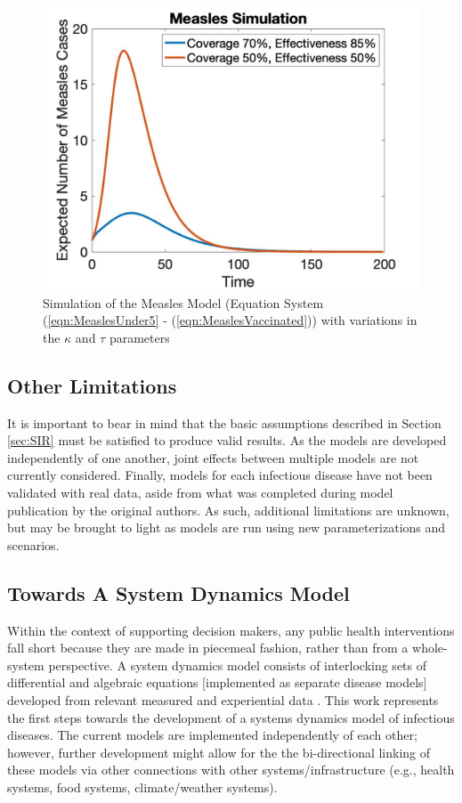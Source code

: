 \documentclass[letter,12pt, usenames,dvipsnames]{article}
\begin{document}
\begin{figure}[h!]
    \centering
    \includegraphics[width = .7\textwidth]{measlesScenario.jpg}
    \caption{Simulation of the Measles Model (Equation System (\ref{eqn:MeaslesUnder5} - (\ref{eqn:MeaslesVaccinated})) with variations in the $\kappa$ and $\tau$ parameters}
    \label{fig:measlesScenario}
\end{figure}




\subsection{Other Limitations}
It is important to bear in mind that the basic assumptions described in Section \ref{sec:SIR} must be satisfied to produce valid results. As the models are developed independently of one another, joint effects between multiple models are not currently considered. Finally, models for each infectious disease have not been validated with real data, aside from what was completed during model publication by the original authors. As such, additional limitations are unknown, but may be brought to light as models are run using new parameterizations and scenarios.

\subsection{Towards A System Dynamics Model}
Within the context of supporting decision makers, any public health interventions fall short because they are made in piecemeal fashion, rather than from a whole-system perspective. A system dynamics model consists of interlocking sets of differential and algebraic equations [implemented as separate disease models] developed from relevant measured and experiential data \cite{systemsdynamics}.  This work represents the first steps towards the development of a systems dynamics model of infectious diseases.  The current models are implemented independently of each other; however, further development might allow for the the bi-directional linking of these models via other connections with other systems/infrastructure (e.g., health systems, food systems, climate/weather systems).
\end{document}
